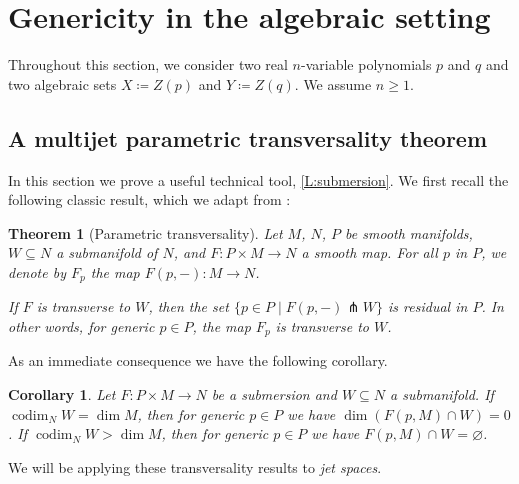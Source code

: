 \documentclass{amsart}
\newtheorem{theorem}[subsubsection]{Theorem}
\newtheorem{corollary}[subsubsection]{Corollary}
\theoremstyle{definition}
\theoremstyle{remark}
\begin{document}
\section{Genericity in the algebraic setting}
\label{S:Genericity-algebraic}

Throughout this section, we consider two real $n$-variable polynomials $p$ and $q$ and two algebraic sets $X \coloneqq Z(p)$ and $Y \coloneqq Z(q)$. We assume $n \geq 1$.


\subsection{A multijet parametric transversality theorem}\label{sec:multijet}

In this section we prove a useful technical tool, \cref{L:submersion}. We first recall the following classic result, which we adapt from \cite[Chapter 3, Theorem 2.7]{Hirsch1976}:

\begin{theorem}[Parametric transversality]
\label{T:parametric-transversality}
Let $M$, $N$, $P$ be smooth manifolds, $W \subseteq N$ a submanifold of $N$, and $F \colon P \times M \to N$ a smooth map. For all $p$ in $P$, we denote by $F_p$ the map $F(p, -) \colon M \to N$.

If $F$ is transverse to $W$, then the set $\{p \in P \mid F(p, -) \pitchfork W\}$ is residual in $P$. In other words, for generic $p \in P$, the map $F_p$ is transverse to $W$.
\end{theorem}

As an immediate consequence we have the following corollary.

\begin{corollary}
\label{C:param-trans-cor}
Let $F \colon P \times M \to N$ be a submersion and $W \subseteq N$ a submanifold. If $\operatorname{codim}_N W = \dim M$, then for generic $p \in P$ we have $\dim(F(p, M) \cap W) = 0$. If $\operatorname{codim}_N W > \dim M$, then for generic $p \in P$ we have $F(p, M) \cap W = \varnothing$.
\end{corollary}


We will be applying these transversality results to \emph{jet spaces}.
\end{document}
